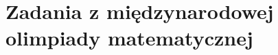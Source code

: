 \documentclass{greaseproof}
\begin{document}
\section{Zadania z międzynarodowej olimpiady matematycznej}



{}


\raggedright
{}
\printindex

\printindex[persons]
\end{document}
